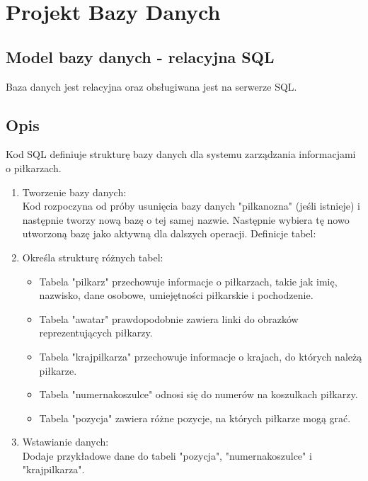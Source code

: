 \section{Projekt Bazy Danych}
    \subsection{Model bazy danych - relacyjna SQL}
        Baza danych jest relacyjna oraz obsługiwana jest na serwerze SQL.
    \subsection{Opis}

            Kod SQL definiuje strukturę bazy danych dla systemu zarządzania informacjami o piłkarzach.

            \begin{enumerate}
                \item Tworzenie bazy danych:\\
                Kod rozpoczyna od próby usunięcia bazy danych "pilkanozna" (jeśli istnieje) i następnie tworzy nową bazę o tej samej nazwie.
                Następnie wybiera tę nowo utworzoną bazę jako aktywną dla dalszych operacji.
                Definicje tabel:
                \item Określa strukturę różnych tabel:\\
                \begin{itemize}
                    \item Tabela "pilkarz" przechowuje informacje o piłkarzach, takie jak imię, nazwisko, dane osobowe, umiejętności piłkarskie i pochodzenie.
                    \item Tabela "awatar" prawdopodobnie zawiera linki do obrazków reprezentujących piłkarzy.
                    \item Tabela "krajpilkarza" przechowuje informacje o krajach, do których należą piłkarze.
                    \item Tabela "numernakoszulce" odnosi się do numerów na koszulkach piłkarzy.
                    \item Tabela "pozycja" zawiera różne pozycje, na których piłkarze mogą grać.
                \end{itemize}
                             
                \item Wstawianie danych:\\
                Dodaje przykładowe dane do tabeli "pozycja", "numernakoszulce" i "krajpilkarza".
            \end{enumerate}

